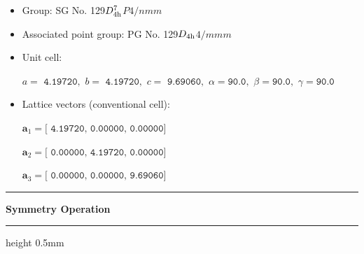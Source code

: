 \documentclass[fleqn,10pt,landscape]{jsarticle}
\begin{document}
\begin{itemize}
\item Group: SG No. 129\quad$D_{\rm 4h}^{7}$\quad$P4/nmm$\quad[ tetragonal ]
\item Associated point group: PG No. 129\quad$D_{\rm 4h}$\quad$4/mmm$\quad[ tetragonal ]
\end{itemize}
\begin{itemize}
\item Unit cell:

\quad $a=\texttt{ 4.19720},\,\, b=\texttt{ 4.19720},\,\, c=\texttt{ 9.69060},\,\, \alpha=\texttt{90.0},\,\, \beta=\texttt{90.0},\,\, \gamma=\texttt{90.0}$

\item Lattice vectors (conventional cell):

\quad $\bm{a}_1=\texttt{[ 4.19720, 0.00000, 0.00000]}$

\quad $\bm{a}_2=\texttt{[ 0.00000, 4.19720, 0.00000]}$

\quad $\bm{a}_3=\texttt{[ 0.00000, 0.00000, 9.69060]}$

\end{itemize}
\vspace{5mm}
\noindent \rule[0.5mm]{5mm}{0.5mm}\hspace{3mm}\textbf{Symmetry Operation}\hspace{3mm}\leaders\hrule height 0.5mm\hfill\kern0pt
\vspace{3mm}
\end{document}
